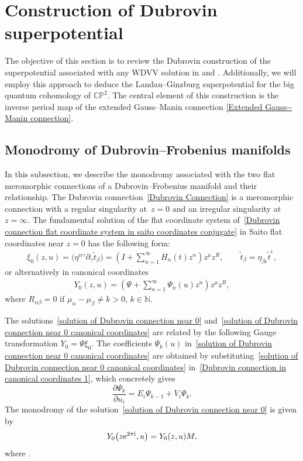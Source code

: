 \section{Construction of Dubrovin superpotential}\label{Construction of Dubrovin superpotential}

The objective of this section is to review the Dubrovin construction of the superpotential associated with any WDVV solution in \cite[Appendix J]{B.Dubrovin2} and \cite[Chapter 5]{B.Dubrovin3}. Additionally, we will employ this approach to deduce the Landau--Ginzburg superpotential for the big quantum cohomology of $\mathbb{CP}^2$. The central element of this construction is the inverse period map of the extended Gauss--Manin connection \eqref{Extended Gauss--Manin connection}.

\subsection{Monodromy of Dubrovin--Frobenius manifolds}

In this subsection, we describe the monodromy associated with the two flat meromorphic connections of a Dubrovin--Frobenius manifold and their relationship.
The Dubrovin connection~\eqref{Dubrovin Connection} is a meromorphic connection with a regular singularity at~${z=0}$ and an irregular singularity at $z=\infty$. The fundamental solution of the flat coordinate system of~\eqref{Dubrovin connection flat coordinate system in saito coordinates conjugate} in Saito flat coordinates near $z=0$ has the following form:
\begin{gather}
 \xi_0(z,u)=\bigl(\eta^{\alpha\gamma}\partial_{\gamma}\tilde t_{\beta}\bigr)=\left(I+\sum_{n=1}^{\infty}H_n(t)z^n \right)z^{\mu}z^R, \qquad \tilde t_{\beta}=\eta_{\beta\epsilon}\tilde t^{\epsilon},\label{solution of Dubrovin connection near 0}
\end{gather}
or alternatively in canonical coordinates
\begin{gather}\label{solution of Dubrovin connection near 0 canonical coordinates}
 Y_0(z,u)=\left(\Psi+\sum_{n=1}^{\infty}\Psi_n(u)z^n \right)z^{\mu}z^R,
\end{gather}
where $R_{\alpha\beta}=0$ if $\mu_{\alpha}-\mu_{\beta} \neq k>0$, $k\in \mathbb{N}$.

The solutions~\eqref{solution of Dubrovin connection near 0} and~\eqref{solution of Dubrovin connection near 0 canonical coordinates} are related by the following Gauge transformation
$ Y_0=\Psi \xi_0$.
The coefficients $\Psi_k(u)$ in~\eqref{solution of Dubrovin connection near 0 canonical coordinates} are obtained by substituting~\eqref{solution of Dubrovin connection near 0 canonical coordinates} in~\eqref{Dubrovin connection in canonical coordinates 1}, which concretely gives
\[
 \frac{\partial \Psi_k}{\partial u_i}=E_i\Psi_{k-1}+V_i\Psi_k.
 \]
The monodromy of the solution~\eqref{solution of Dubrovin connection near 0} is given by
\[
Y_0\bigl(z{\rm e}^{2\pi {\rm i}},u\bigr)=Y_0(z,u)M,
\]
 where .

